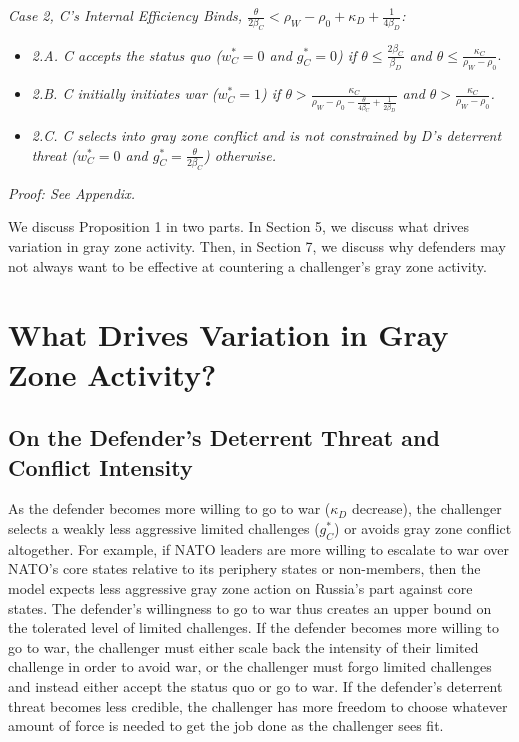 \documentclass[
]{article}
\begin{document}
\textit{Case 2, C's Internal Efficiency Binds, $\frac{\theta}{2\beta_{C}}<\rho_{W}-\rho_{0}+\kappa_{D}+\frac{1}{4\beta_{D}}$:}

\begin{itemize}
  \item \textit{2.A. C accepts the status quo ($w_{C}^{*}=0$ and $g_{C}^{*}=0$) if $\theta\leq\frac{2\beta_{C}}{\beta_{D}}$ and $\theta\leq\frac{\kappa_{C}}{\rho_{W}-\rho_{0}}$}. 
    \item \textit{2.B. C initially initiates war ($w_{C}^{*}=1$) if $\theta>\frac{\kappa_{C}}{\rho_{W}-\rho_{0}-\frac{\theta}{4\beta_{C}}+\frac{1}{2\beta_{D}}}$ and $\theta>\frac{\kappa_{C}}{\rho_{W}-\rho_{0}}$.} 
    \item \textit{2.C. C selects into gray zone conflict and is not constrained
    by D's deterrent threat ($w_{C}^{*}=0$ and $g_{C}^{*}=\frac{\theta}{2\beta_{C}}$)
    otherwise.} 
  \end{itemize}

\textit{Proof: See Appendix.}

We discuss Proposition 1 in two parts. In Section 5, we discuss what drives variation in gray zone activity. Then, in Section 7, we discuss why defenders may not always want to be effective at countering a challenger's gray zone activity.

\hypertarget{what-drives-variation-in-gray-zone-activity}{%
\section{What Drives Variation in Gray Zone Activity?}\label{what-drives-variation-in-gray-zone-activity}}

\hypertarget{on-the-defenders-deterrent-threat-and-conflict-intensity}{%
\subsection{On the Defender's Deterrent Threat and Conflict Intensity}\label{on-the-defenders-deterrent-threat-and-conflict-intensity}}

As the defender becomes more willing to go to war (\(\kappa_{D}\) decrease), the challenger selects a weakly less aggressive limited challenges (\(g_{C}^{*}\)) or avoids gray zone conflict altogether. For example, if NATO leaders are more willing to escalate to war over NATO's core states relative to its periphery states or non-members, then the model expects less aggressive gray zone action on Russia's part against core states. The defender's willingness to go to war thus creates an upper bound on the tolerated level of limited challenges. If the defender becomes more willing to go to war, the challenger must either scale back the intensity of their limited challenge in order to avoid war, or the challenger must forgo limited challenges and instead either accept the status quo or go to war. If the defender's deterrent threat becomes less credible, the challenger has more freedom to choose whatever amount of force is needed to get the job done as the challenger sees fit.
\end{document}
